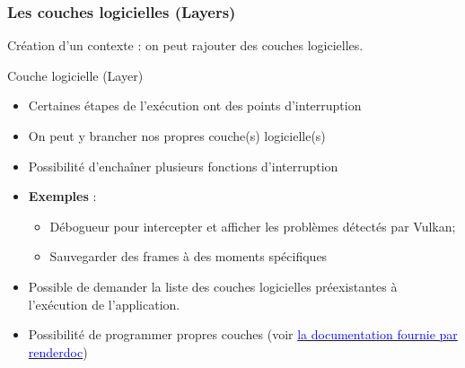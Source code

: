 \documentclass{beamer}
\begin{document}
\begin{frame}[fragile]
\frametitle{Les couches logicielles (Layers)}

Création d'un contexte : on peut rajouter des couches logicielles.

\begin{block}{Couche logicielle (Layer)}
\begin{itemize}
\item Certaines étapes de l'exécution ont des points d'interruption
\item On peut y brancher  nos propres couche(s) logicielle(s)
\item Possibilité d'enchaîner  plusieurs fonctions d'interruption
\item \textcolor{NavyBlue}{\bf Exemples} :
\begin{itemize}
\item Débogueur pour intercepter et afficher les problèmes détectés par Vulkan;
\item Sauvegarder des frames à des moments spécifiques
\end{itemize}
\item Possible de demander la liste des couches logicielles préexistantes
 à l'exécution de l'application.
 \item Possibilité de programmer propres couches 
 (voir \href{https://renderdoc.org/vulkan-layer-guide.html}{\textcolor{blue}{la documentation fournie par renderdoc}})
\end{itemize}
\end{block}
\end{frame}
\end{document}
